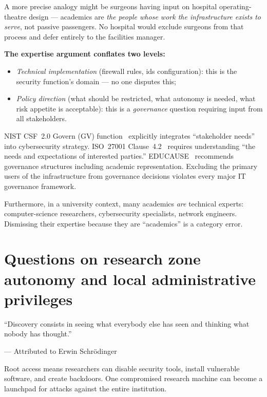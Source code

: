 \begin{answerbox}[Answer to Q2.4]
A more precise analogy might be surgeons having input on hospital operating-theatre design --- academics are \emph{the people whose work the infrastructure exists to serve}, not passive passengers. No hospital would exclude surgeons from that process and defer entirely to the facilities manager.

\medskip\noindent\textbf{The expertise argument conflates two levels:}
\begin{itemize}[nosep]
    \item \emph{Technical implementation} (firewall rules, \gls{ids} configuration): this is the security function's domain --- no one disputes this;
    \item \emph{Policy direction} (what should be restricted, what autonomy is needed, what risk appetite is acceptable): this is a \emph{governance} question requiring input from all stakeholders.
\end{itemize}

\noindent NIST CSF~2.0 Govern (GV) function~\cite{nist-csf} explicitly integrates ``stakeholder needs'' into cybersecurity strategy. ISO~27001 Clause~4.2~\cite{iso27001} requires understanding ``the needs and expectations of interested parties.'' EDUCAUSE~\cite{educause-governance} recommends governance structures including academic representation. Excluding the primary users of the infrastructure from governance decisions violates every major IT governance framework.

\medskip\noindent Furthermore, in a university context, many academics \emph{are} technical experts: computer-science researchers, cybersecurity specialists, network engineers. Dismissing their expertise because they are ``academics'' is a category error.
\end{answerbox}

\section{Questions on research zone autonomy and local administrative privileges}
\label{sec:q-autonomy}

\epigraph{``Discovery consists in seeing what everybody else has seen and thinking what nobody has thought.''}{--- Attributed to Erwin Schr\"odinger}

\begin{questionbox}
Root access means researchers can disable security tools, install vulnerable software, and create backdoors. One compromised research machine can become a launchpad for attacks against the entire institution.
\end{questionbox}

